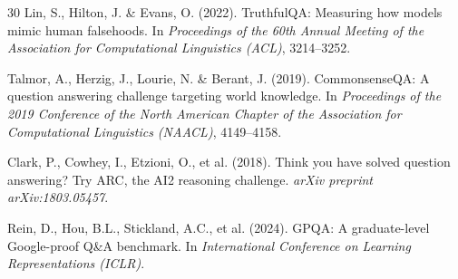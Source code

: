 \documentclass[12pt,a4paper,UTF8,fontset=fandol]{ctexart}
\begin{document}
\begin{thebibliography}{30}
Lin, S., Hilton, J. \& Evans, O. (2022). TruthfulQA: Measuring how models mimic human falsehoods. In \textit{Proceedings of the 60th Annual Meeting of the Association for Computational Linguistics (ACL)}, 3214--3252.

Talmor, A., Herzig, J., Lourie, N. \& Berant, J. (2019). CommonsenseQA: A question answering challenge targeting world knowledge. In \textit{Proceedings of the 2019 Conference of the North American Chapter of the Association for Computational Linguistics (NAACL)}, 4149--4158.

Clark, P., Cowhey, I., Etzioni, O., et al. (2018). Think you have solved question answering? Try ARC, the AI2 reasoning challenge. \textit{arXiv preprint arXiv:1803.05457}.

Rein, D., Hou, B.L., Stickland, A.C., et al. (2024). GPQA: A graduate-level Google-proof Q\&A benchmark. In \textit{International Conference on Learning Representations (ICLR)}.

\end{thebibliography}
\end{document}
